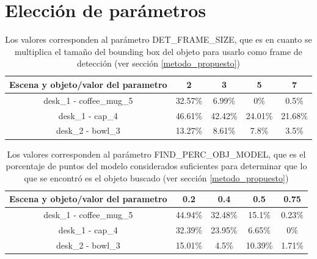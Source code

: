 \section{Elección de parámetros}\label{eleccion_parametros}
\begin{table}[h]
	\begin{tabular}{|c|c|c|c|c|}
	\hline 
	Escena y objeto/valor del parametro & 2 & 3 & 5 & 7 \\ 
	\hline 
	desk\_1 - coffee\_mug\_5 & 32.57\% & 6.99\% & 0\% & 0.5\% \\ 
	\hline 
	desk\_1 - cap\_4 & 46.61\% & 42.42\% & 24.01\% & 21.68\% \\ 
	\hline 
	desk\_2 - bowl\_3 & 13.27\% & 8.61\% & 7.8\% & 3.5\% \\ 
	\hline 
	\end{tabular}
	\caption{Los valores corresponden al parámetro DET\_FRAME\_SIZE, que es en cuanto se multiplica el tamaño del bounding box del objeto para usarlo como frame de detección (ver sección \ref{metodo_propuesto})}
\end{table}


\begin{table}[h]
	\begin{tabular}{|c|c|c|c|c|}
	\hline 
	Escena y objeto/valor del parametro & 0.2 & 0.4 & 0.5 & 0.75 \\ 
	\hline 
	desk\_1 - coffee\_mug\_5 & 44.94\% & 32.48\% & 15.1\% & 0.23\% \\ 
	\hline 
	desk\_1 - cap\_4 & 32.39\% & 23.95\% & 6.65\% & 0\% \\ 
	\hline 
	desk\_2 - bowl\_3 & 15.01\% & 4.5\% & 10.39\% & 1.71\% \\ 
	\hline 
	\end{tabular}
	\caption{Los valores corresponden al parámetro FIND\_PERC\_OBJ\_MODEL, que es el porcentaje de puntos del modelo considerados suficientes para determinar que lo que se encontró es el objeto buscado (ver sección \ref{metodo_propuesto})}
\end{table}

